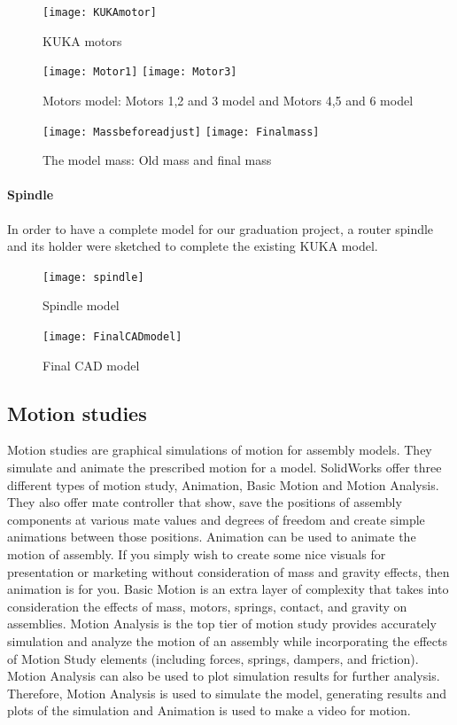 \begin{figure}[H]
	\centering
	\texttt{[image: KUKAmotor]}
	\caption{KUKA motors}
\end{figure}

\begin{figure}[H]
		\centering
		\texttt{[image: Motor1]}
		\texttt{[image: Motor3]}
	\caption{Motors model: Motors 1,2 and 3 model and Motors 4,5 and 6 model}
	\label{fig:fig}
\end{figure}

\begin{figure}[H]
		\centering
		\texttt{[image: Massbeforeadjust]}
		\texttt{[image: Finalmass]}
	\caption{The model mass: Old mass and final mass}
	\label{fig:fig22}
\end{figure}

\paragraph{Spindle}
In order to have a complete model for our graduation project, a router spindle and its holder were sketched to complete the existing KUKA model.

\begin{figure}[H]
	\centering
	\texttt{[image: spindle]}
	\caption{Spindle model}
\end{figure}

\begin{figure}[H]
	\centering
	\texttt{[image: FinalCADmodel]}
	\caption{Final CAD model}
\end{figure}

\subsection{Motion studies}
Motion studies are graphical simulations of motion for assembly models. They simulate and animate the prescribed motion for a model. SolidWorks offer three different types of motion study, Animation, Basic Motion and Motion Analysis. They also offer mate controller that show, save the positions of assembly components at various mate values and degrees of freedom and create simple animations between those positions.
\smallskip
\newline Animation can be used to animate the motion of assembly. If you simply wish to create some nice visuals for presentation or marketing without consideration of mass and gravity effects, then animation is for you. 
\newline Basic Motion is an extra layer of complexity that takes into consideration the effects of mass, motors, springs, contact, and gravity on assemblies. 
\smallskip
\newline Motion Analysis is the top tier of motion study provides accurately simulation and analyze the motion of an assembly while incorporating the effects of Motion Study elements (including forces, springs, dampers, and friction). Motion Analysis can also be used to plot simulation results for further analysis.
\smallskip
\newline Therefore, Motion Analysis is used to simulate the model, generating results and plots of the simulation and Animation is used to make a video for motion.

